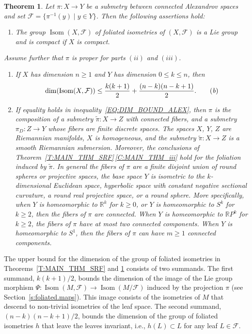 \documentclass[pdftex]{sigma}
\numberwithin{equation}{section}
\newtheorem{theoremalpha}{Theorem}
\theoremstyle{definition}
\DeclareMathOperator{\Iso}{Isom}
\newcommand{\R}{\mathbb{R}} %
\newcommand{\Sp}{S} %
\newcommand{\RP}{\mathbb{R}P} %
\newcommand{\fol}{\mathcal{F}}
\newcommand{\p}{\pi}
\begin{document}
	\begin{theoremalpha}\label{T:MAIN_THM}
		Let $\pi\colon X\to Y$ be a submetry between connected Alexandrov spaces and set $\fol = \big\{\p^{-1}(y)\mid y\in Y\big\}$. Then the following assertions hold:
		\begin{enumerate}[label=$(\roman*)$]\itemsep=0pt
			\item\label{T:MAIN_THM_i} The group $\Iso(X,\fol)$ of foliated isometries of $(X,\fol)$ is a Lie group and is compact if $X$ is compact.
 \end{enumerate}
 Assume further that $\pi$ is proper for parts $(ii)$ and $(iii)$.
 \begin{enumerate}[label=$(\roman*)$]\itemsep=0pt
 \setcounter{enumi}{1}
			\item\label{T:MAIN_THM_ii}
 If $X$ has dimension $n\geq 1$ and $Y$ has dimension $0\leq k \leq n$, then
			\begin{equation}
				\dim(\Iso(X,\fol))\leq\frac{k(k+1)}{2} + \frac{(n-k)(n-k+1)}{2}.\tag{\emph{b}}\label{EQ:DIM_BOUND_ALEX}
			\end{equation}
\item\label{T:MAIN_THM_iii}If equality holds in inequality~\eqref{EQ:DIM_BOUND_ALEX}, then
$\pi$ is the composition of a submetry $\tilde{\pi}\colon X\to Z$ with connected fibers, and a submetry $\pi_D\colon Z\to Y$ whose fibers are finite discrete spaces. The spaces $X$, $Y$, $Z$ are Riemannian manifolds, $X$ is homogeneous, and the submetry $\tilde{\pi}\colon {X\to Z}$ is a smooth Riemannian submersion. Moreover, the conclusions of Theorem~\ref{T:MAIN_THM_SRF}\,\ref{C:MAIN_THM_iii} hold for the foliation induced by $\tilde{\pi}$. In general the fibers of $\pi$ are a finite disjoint union of round spheres or projective spaces, the base space $Y$ is isometric to the $k$-dimensional Euclidean space, hyperbolic space with constant negative sectional curvature, a round real projective space, or a round sphere.
More specifically, when $Y$ is homeomorphic to $\R^k$ for $k\geq0$, or $Y$ is homeomorphic to $\Sp^k$ for $k\geq 2$, then the fibers of $\pi$ are connected. When $Y$ is homeomorphic to $\RP^k$ for $k\geq 2$, the fibers of $\pi$ have at most two connected components. When $Y$ is homeomorphic to $\Sp^1$, then the fibers of $\pi$ can have $m\geq 1$ connected components. 	
\end{enumerate}
	\end{theoremalpha}

The upper bound for the dimension of the group of foliated isometries in Theorems~\ref{T:MAIN_THM_SRF} and \ref{T:MAIN_THM} consists of two summands. The first summand, $k(k+1)/2$, bounds the dimension of the image of the Lie group morphism $\Psi\colon \Iso(M,\fol)\to \Iso(M/\fol)$ induced by the projection $\pi$ (see Section~\ref{s:foliated.maps}).
This image consists of the isometries of $M$ that descend to non-trivial isometries of the leaf space. The second summand, $(n-k)(n-k+1)/2$, bounds the dimension of the group of foliated isometries $h$ that leave the leaves invariant, i.e., $h(L)\subset L$ for any leaf $L\in \fol$.
\end{document}
